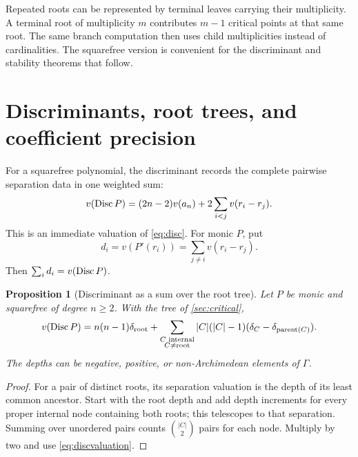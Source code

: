 \documentclass[11pt,letterpaper,oneside]{article}
\numberwithin{equation}{section}
\newtheorem{proposition}[theorem]{Proposition}
\theoremstyle{definition}
\theoremstyle{remark}\newtheorem{remark}[theorem]{Remark}
\newcommand{\C}{\mathbb C}\newcommand{\R}{\mathbb R}\newcommand{\Q}{\mathbb Q}
\begin{document}
Repeated roots can be represented by terminal leaves carrying their
multiplicity. A terminal root of multiplicity $m$ contributes $m-1$
critical points at that same root. The same branch computation then uses
child multiplicities instead of cardinalities. The squarefree version is
convenient for the discriminant and stability theorems that follow.

\section{Discriminants, root trees, and coefficient precision}\label{sec:stability}
For a squarefree polynomial, the discriminant records the complete
pairwise separation data in one weighted sum:
\begin{equation}\label{eq:discvaluation}
 v(\operatorname{Disc} P)=(2n-2)v(a_n)+2\sum_{i<j}v(r_i-r_j).
\end{equation}
This is an immediate valuation of \eqref{eq:disc}. For monic $P$, put
\begin{equation}\label{eq:derivativedepth}
 d_i=v(P'(r_i))=\sum_{j\ne i}v(r_i-r_j).
\end{equation}
Then $\sum_i d_i=v(\operatorname{Disc} P)$.

\begin{proposition}[Discriminant as a sum over the root tree]\label{prop:disctree}
Let $P$ be monic and squarefree of degree $n\geq2$. With the tree of
\cref{sec:critical},
\begin{equation}\label{eq:disctree}
 v(\operatorname{Disc} P)=n(n-1)\delta_{\mathrm{root}}
 +\sum_{\substack{C\text{ internal}\\C\ne\mathrm{root}}}
 |C|(|C|-1)(\delta_C-\delta_{\mathrm{parent}(C)}).
\end{equation}
The depths can be negative, positive, or non-Archimedean elements of
$\Gamma$.
\end{proposition}
\begin{proof}
For a pair of distinct roots, its separation valuation is the depth of
its least common ancestor. Start with the root depth and add depth
increments for every proper internal node containing both roots; this
telescopes to that separation. Summing over unordered pairs counts
$\binom{|C|}{2}$ pairs for each node. Multiply by two and use
\eqref{eq:discvaluation}.
\end{proof}
\end{document}
